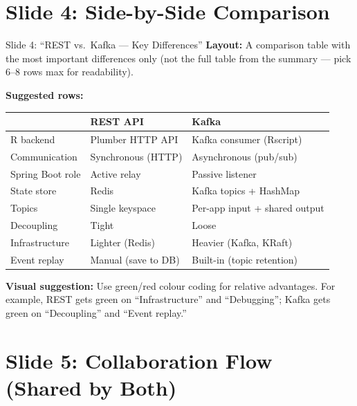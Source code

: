 \documentclass[12pt,a4paper]{article}
\begin{document}
\section{Slide 4: Side-by-Side Comparison}

\begin{slidebox}{Slide 4: ``REST vs.\ Kafka --- Key Differences''}
\textbf{Layout:} A comparison table with the most important differences only (not the full table from the summary --- pick 6--8 rows max for readability).

\textbf{Suggested rows:}

\begin{tabular}{@{}lll@{}}
\toprule
& \textbf{REST API} & \textbf{Kafka} \\
\midrule
R backend & Plumber HTTP API & Kafka consumer (Rscript) \\
Communication & Synchronous (HTTP) & Asynchronous (pub/sub) \\
Spring Boot role & Active relay & Passive listener \\
State store & Redis & Kafka topics + HashMap \\
Topics & Single keyspace & Per-app input + shared output \\
Decoupling & Tight & Loose \\
Infrastructure & Lighter (Redis) & Heavier (Kafka, KRaft) \\
Event replay & Manual (save to DB) & Built-in (topic retention) \\
\bottomrule
\end{tabular}

\textbf{Visual suggestion:} Use green/red colour coding for relative advantages. For example, REST gets green on ``Infrastructure'' and ``Debugging''; Kafka gets green on ``Decoupling'' and ``Event replay.''
\end{slidebox}

\section{Slide 5: Collaboration Flow (Shared by Both)}
\end{document}
